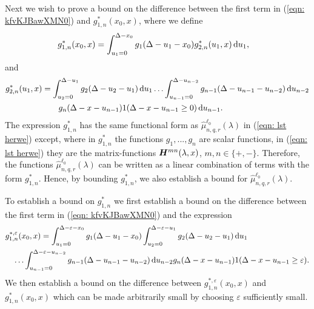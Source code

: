 Next we wish to prove a bound on the difference between the first term in (\ref{eqn: kfvKJBawXMN0}) and \(g^*_{1,n}(x_0,x)\), where we define 
	\begin{align}
		g^*_{1,n}(x_0,x) &= \int_{u_1=0}^{\Delta-x_0}g_1(\Delta - u_1 - x_0)g^*_{2,n}(u_1,x)\, \mathrm{d} u_1,
	\end{align}
	and
	\begin{align}
		g^*_{2,n}(u_1,x) &= \int_{u_2=0}^{\Delta-u_1}g_2(\Delta - u_2 - u_1)\, \mathrm{d} u_1 \dots \nonumber 
            	\int_{u_{n-1}=0}^{\Delta-u_{n-2}} g_{n-1}(\Delta - u_{n-1} - u_{n-2}) \, \mathrm{d} u_{n-2}
            	\\&\qquad{}g_{n}(\Delta - x-u_{n-1})1(\Delta-x-u_{n-1}\geq0)\, \mathrm{d} u_{n-1}.
	\end{align}
	The expression \(g^*_{1,n}\) has the same functional form as \(\widehat \mu^{\ell_0}_{n,q,r}(\lambda)\) in (\ref{eqn: lst herwe}) except, where in \(g^*_{1,n}\) the functions \(g_1,...,g_n\) are scalar functions, in (\ref{eqn: lst herwe}) they are the matrix-functions \(\boldsymbol H^{mn}(\lambda,x)\), \(m,n\in\{+,-\}\). Therefore, the functions \(\widehat \mu^{\ell_0}_{n,q,r}(\lambda)\) can be written as a linear combination of terms with the form \(g^*_{1,n}\). Hence, by bounding \(g^*_{1,n}\), we also establish a bound for \(\widehat \mu^{\ell_0}_{n,q,r}(\lambda)\).

To establish a bound on \(g^*_{1,n}\) we first establish a bound on the difference between the first term in (\ref{eqn: kfvKJBawXMN0}) and the expression 
	\begin{align}
		&g^{*,\varepsilon}_{1,n}(x_0,x) = 
		\int_{u_1=0}^{\Delta-\varepsilon-x_0}g_1(\Delta - u_1 - x_0)
		\int_{u_2=0}^{\Delta-\varepsilon-u_1}g_2(\Delta - u_2 - u_1)\, \mathrm{d} u_1  \nonumber 
		\\&\quad\hdots 
            	\int_{u_{n-1}=0}^{\Delta-\varepsilon-u_{n-2}} g_{n-1}(\Delta - u_{n-1} - u_{n-2}) \, \mathrm{d} u_{n-2}
            	g_{n}(\Delta-x-u_{n-1}) 
		1(\Delta-x-u_{n-1}\geq\varepsilon).
	\end{align}
	We then establish a bound on the difference between \(g^{*,\varepsilon}_{1,n}(x_0,x)\) and \(g^{*}_{1,n}(x_0,x)\) which can be made arbitrarily small by choosing \(\varepsilon\) sufficiently small. 

